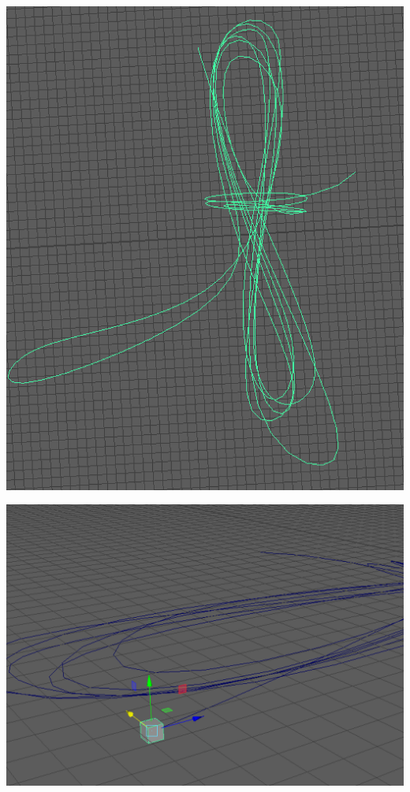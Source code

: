 \documentclass[a4paper, openright, twoside]{book}
\begin{document}
\begin{minipage}{\textwidth}\label{tow}
\begin{center}
    \centering
    \begin{minipage}{0.18\textwidth}
        \centering
        \includegraphics[width=1\textwidth]{images/towcurve.png}
    \end{minipage}\hfill
    \begin{minipage}{0.18\textwidth}
        \centering
        \includegraphics[width=1\textwidth]{images/towpoly.png}

\end{minipage}
\end{center}
\end{minipage}
\end{document}
